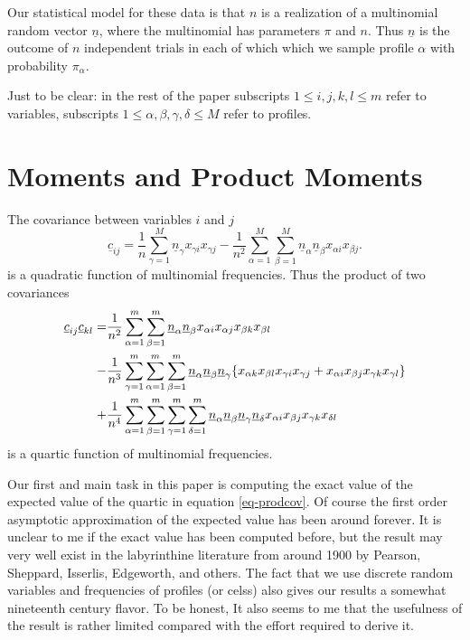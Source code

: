 \documentclass[
  12pt,
  letterpaper,
  DIV=11,
  numbers=noendperiod]{scrartcl}
\newcommand{\sectionbreak}{\clearpage}
\newcommand{\ul}[1]{\underline{#1}}
\begin{document}
Our statistical model for these data is that \(n\) is a realization of a
multinomial random vector \(\ul{n}\), where the multinomial has
parameters \(\pi\) and \(n\). Thus \(\ul{n}\) is the outcome of \(n\)
independent trials in each of which which we sample profile \(\alpha\)
with probability \(\pi_\alpha\).

Just to be clear: in the rest of the paper subscripts
\(1\leq i,j,k,l\leq m\) refer to variables, subscripts
\(1\leq \alpha,\beta,\gamma,\delta\leq M\) refer to profiles.

\sectionbreak

\section{Moments and Product Moments}\label{moments-and-product-moments}

The covariance between variables \(i\) and \(j\) \begin{equation}
\ul{c}_{ij}=\frac{1}{n}\sum_{\gamma=1}^M\ul{n}_\gamma x_{\gamma i}x_{\gamma j}-\frac{1}{n^2}\sum_{\alpha=1}^M\sum_{\beta=1}^M\ul{n}_\alpha\ul{n}_\beta x_{\alpha i}x_{\beta j}.\label{eq-covfreq}
\end{equation} is a quadratic function of multinomial frequencies. Thus
the product of two covariances \begin{align}
\ul{c}_{ij}\ul{c}_{kl}=&\frac{1}{n^2}\sum_{\alpha=1}^m\sum_{\beta=1}^m\ul{n}_\alpha \ul{n}_\beta x_{\alpha i}x_{\alpha j}x_{\beta k}x_{\beta l}\notag\\
-&\frac{1}{n^3}\sum_{\gamma=1}^m\sum_{\alpha=1}^m\sum_{\beta=1}^m\ul{n}_\alpha \ul{n}_\beta\ul{n}_\gamma\{x_{\alpha k}x_{\beta l}x_{\gamma i}x_{\gamma j}
+x_{\alpha i}x_{\beta j}x_{\gamma k}x_{\gamma l}\}\notag\\
+&\frac{1}{n^4}\sum_{\alpha=1}^m\sum_{\beta=1}^m\sum_{\gamma=1}^m\sum_{\delta=1}^m\ul{n}_\alpha\ul{n}_\beta\ul{n}_\gamma\ul{n}_\delta x_{\alpha i}x_{\beta j} x_{\gamma k}x_{\delta l}\label{eq-prodcov}
\end{align} is a quartic function of multinomial frequencies.

Our first and main task in this paper is computing the exact value of
the expected value of the quartic in equation \eqref{eq-prodcov}. Of
course the first order asymptotic approximation of the expected value
has been around forever. It is unclear to me if the exact value has been
computed before, but the result may very well exist in the labyrinthine
literature from around 1900 by Pearson, Sheppard, Isserlis, Edgeworth,
and others. The fact that we use discrete random variables and
frequencies of profiles (or celss) also gives our results a somewhat
nineteenth century flavor. To be honest, It also seems to me that the
usefulness of the result is rather limited compared with the effort
required to derive it.
\end{document}
